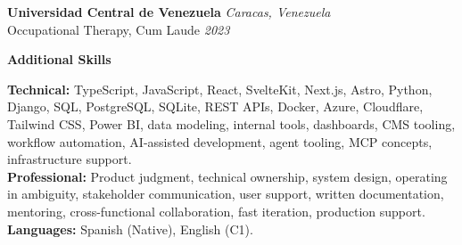 \documentclass[10pt]{article}
\newcommand{\sectiontitle}[1]{%
    \vspace{5pt}
    \begin{center}
        \textbf{#1}
    \end{center}
    \vspace{-6pt}
}
\begin{document}
\vspace{3pt}
\textbf{Universidad Central de Venezuela} \hfill \textit{Caracas, Venezuela} \\
Occupational Therapy, Cum Laude \hfill \textit{2023}

\sectiontitle{Additional Skills}
\textbf{Technical:} TypeScript, JavaScript, React, SvelteKit, Next.js, Astro, Python, Django, SQL, PostgreSQL, SQLite, REST APIs, Docker, Azure, Cloudflare, Tailwind CSS, Power BI, data modeling, internal tools, dashboards, CMS tooling, workflow automation, AI-assisted development, agent tooling, MCP concepts, infrastructure support. \\
\textbf{Professional:} Product judgment, technical ownership, system design, operating in ambiguity, stakeholder communication, user support, written documentation, mentoring, cross-functional collaboration, fast iteration, production support. \\
\textbf{Languages:} Spanish (Native), English (C1).
\end{document}
